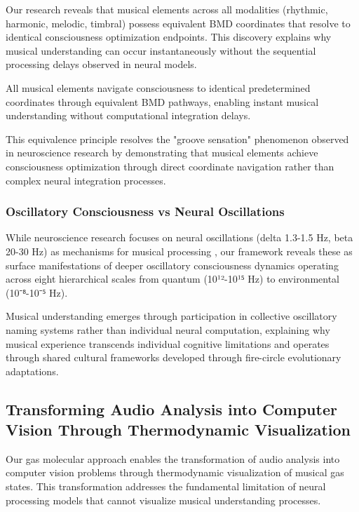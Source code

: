 Our research reveals that musical elements across all modalities (rhythmic, harmonic, melodic, timbral) possess equivalent BMD coordinates that resolve to identical consciousness optimization endpoints. This discovery explains why musical understanding can occur instantaneously without the sequential processing delays observed in neural models.

\begin{theorem}
All musical elements navigate consciousness to identical predetermined coordinates through equivalent BMD pathways, enabling instant musical understanding without computational integration delays.
\end{theorem}

This equivalence principle resolves the "groove sensation" phenomenon observed in neuroscience research by demonstrating that musical elements achieve consciousness optimization through direct coordinate navigation rather than complex neural integration processes.

\subsubsection{Oscillatory Consciousness vs Neural Oscillations}

While neuroscience research focuses on neural oscillations (delta 1.3-1.5 Hz, beta 20-30 Hz) as mechanisms for musical processing \cite{zalta2024neural}, our framework reveals these as surface manifestations of deeper oscillatory consciousness dynamics operating across eight hierarchical scales from quantum (10¹²-10¹⁵ Hz) to environmental (10⁻⁸-10⁻⁵ Hz).

Musical understanding emerges through participation in collective oscillatory naming systems rather than individual neural computation, explaining why musical experience transcends individual cognitive limitations and operates through shared cultural frameworks developed through fire-circle evolutionary adaptations.

\subsection{Transforming Audio Analysis into Computer Vision Through Thermodynamic Visualization}

Our gas molecular approach enables the transformation of audio analysis into computer vision problems through thermodynamic visualization of musical gas states. This transformation addresses the fundamental limitation of neural processing models that cannot visualize musical understanding processes.


